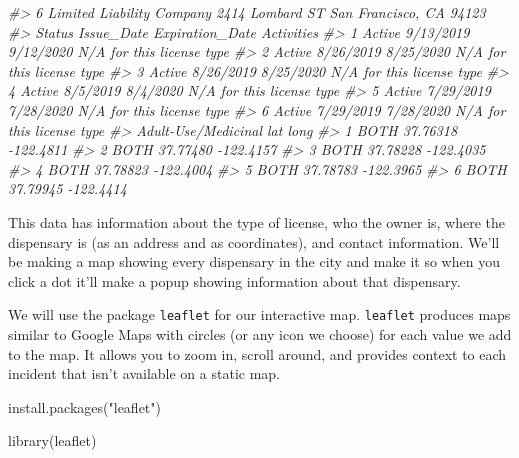 \documentclass[
]{krantz}
\makeatletter
\newenvironment{Shaded}{\begin{snugshade}}{\end{snugshade}}
\newcommand{\CommentTok}[1]{\textcolor[rgb]{0.37,0.37,0.37}{\textit{#1}}}
\newcommand{\FunctionTok}[1]{\textcolor[rgb]{0,0,0}{#1}}
\newcommand{\NormalTok}[1]{#1}
\newcommand{\StringTok}[1]{\textcolor[rgb]{0.5,0.5,0.5}{#1}}
\newenvironment{kframe}{%
\medskip{}
\setlength{\fboxsep}{.8em}
 \def\at@end@of@kframe{}%
 \ifinner\ifhmode%
  \def\at@end@of@kframe{\end{minipage}}%
  \begin{minipage}{\columnwidth}%
 \fi\fi%
 \def\FrameCommand##1{\hskip\@totalleftmargin \hskip-\fboxsep
 \colorbox{shadecolor}{##1}\hskip-\fboxsep
     \hskip-\linewidth \hskip-\@totalleftmargin \hskip\columnwidth}%
 \MakeFramed {\advance\hsize-\width
   \@totalleftmargin\z@ \linewidth\hsize
   \@setminipage}}%
 {\par\unskip\endMakeFramed%
 \at@end@of@kframe}
\renewenvironment{Shaded}{\begin{kframe}}{\end{kframe}}
\makeatother
\begin{document}
\begin{Shaded}
\begin{Highlighting}[]
\CommentTok{\#\textgreater{} 6 Limited Liability Company 2414 Lombard ST San Francisco, CA 94123}
\CommentTok{\#\textgreater{}   Status Issue\_Date Expiration\_Date                Activities}
\CommentTok{\#\textgreater{} 1 Active  9/13/2019       9/12/2020 N/A for this license type}
\CommentTok{\#\textgreater{} 2 Active  8/26/2019       8/25/2020 N/A for this license type}
\CommentTok{\#\textgreater{} 3 Active  8/26/2019       8/25/2020 N/A for this license type}
\CommentTok{\#\textgreater{} 4 Active   8/5/2019        8/4/2020 N/A for this license type}
\CommentTok{\#\textgreater{} 5 Active  7/29/2019       7/28/2020 N/A for this license type}
\CommentTok{\#\textgreater{} 6 Active  7/29/2019       7/28/2020 N/A for this license type}
\CommentTok{\#\textgreater{}   Adult{-}Use/Medicinal      lat      long}
\CommentTok{\#\textgreater{} 1                BOTH 37.76318 {-}122.4811}
\CommentTok{\#\textgreater{} 2                BOTH 37.77480 {-}122.4157}
\CommentTok{\#\textgreater{} 3                BOTH 37.78228 {-}122.4035}
\CommentTok{\#\textgreater{} 4                BOTH 37.78823 {-}122.4004}
\CommentTok{\#\textgreater{} 5                BOTH 37.78783 {-}122.3965}
\CommentTok{\#\textgreater{} 6                BOTH 37.79945 {-}122.4414}
\end{Highlighting}
\end{Shaded}

This data has information about the type of license, who the owner is, where the dispensary is (as an address and as coordinates), and contact information. We'll be making a map showing every dispensary in the city and make it so when you click a dot it'll make a popup showing information about that dispensary.

We will use the package \texttt{leaflet} for our interactive map. \texttt{leaflet} produces maps similar to Google Maps with circles (or any icon we choose) for each value we add to the map. It allows you to zoom in, scroll around, and provides context to each incident that isn't available on a static map.

\begin{Shaded}
\begin{Highlighting}[]
\FunctionTok{install.packages}\NormalTok{(}\StringTok{"leaflet"}\NormalTok{)}
\end{Highlighting}
\end{Shaded}

\begin{Shaded}
\begin{Highlighting}[]
\FunctionTok{library}\NormalTok{(leaflet)}
\end{Highlighting}
\end{Shaded}
\end{document}
